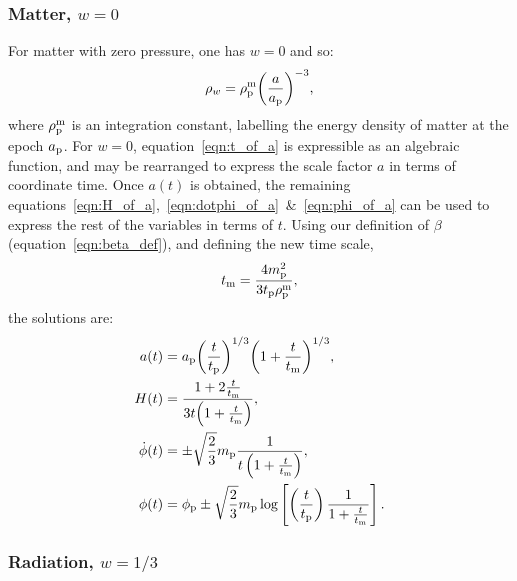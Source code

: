 \subsubsection{Matter, \(w=0\)}
For matter with zero pressure, one has \(w=0\) and so:
\begin{equation}
  \rho_w = \rho_{\mathrm{p}}^{\mathrm{m}}{\left(\frac{a}{a_{\mathrm{p}}}\right)}^{-3},
\end{equation}
where \(\rho_{\mathrm{p}}^{\mathrm{m}}\) is an integration constant, labelling the energy density of matter at the epoch \(a_{\mathrm{p}}\).  For \(w=0\), equation~\eqref{eqn:t_of_a} is expressible as an algebraic function, and may be rearranged to express the scale factor \(a\) in terms of coordinate time. Once \(a(t)\) is obtained, the remaining equations~\eqref{eqn:H_of_a},~\eqref{eqn:dotphi_of_a}~\&~\eqref{eqn:phi_of_a} can be used to express the rest of the variables in terms of \(t\). Using our definition of \(\beta\) (equation~\ref{eqn:beta_def}), and defining the new time scale,
\begin{equation}
  t_{\mathrm{m}} = \frac{4m_{\mathrm{p}}^2}{3t_{\mathrm{p}}\rho_{\mathrm{p}}^{\mathrm{m}} },
  \label{eqn:tm}
\end{equation}
the solutions are:
\begin{align}
  a(t)
  &=
  a_{\mathrm{p}}{\left(\frac{t}{t_{\mathrm{p}}}\right)}^{1/3}
  {\left(1+\frac{t}{t_{\mathrm{m}}}\right)}^{1/3} ,
  \\
  H(t) &= 
  \frac{1+2\frac{t}{t_{\mathrm{m}}}}{3t{{\left( 1+\frac{t}{t_{\mathrm{m}}} \right) }}},
  \\
  \dot{\phi}(t) &= 
  \pm\sqrt{\frac{2}{3}}m_{\mathrm{p}}
  \frac{1}
  {t \left( 1+\frac{t}{t_{\mathrm{m}}} \right) },
  \\
  \phi(t) &=
  \phi_{\mathrm{p}} \pm \sqrt{\frac{2}{3}}m_{\mathrm{p}} \log\left[  
  \left(\frac{t}{t_{\mathrm{p}}}\right) 
  \frac {1}{1+\frac{t}{t_{\mathrm{m}}}}  
  \right].
\end{align}




\subsubsection{Radiation, \(w=1/3\)}

